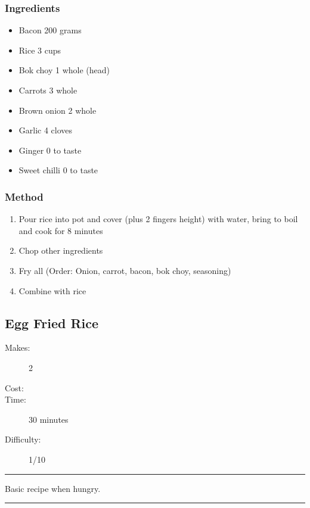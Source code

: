 \documentclass[]{article}
\begin{document}
\subsubsection*{\Large Ingredients}
\begin{multicols}{2}
\begin{itemize}
 \item Bacon \hfill 200 grams
 \item Rice \hfill 3 cups
 \item Bok choy \hfill 1 whole (head)
 \item Carrots \hfill 3 whole
 \item Brown onion \hfill 2 whole
 \item Garlic \hfill 4 cloves
 \item Ginger \hfill 0 to taste
 \item Sweet chilli \hfill 0 to taste
\end{itemize}
\end{multicols}
\subsubsection*{\Large Method}
\begin{enumerate}[font=\huge\color{accent}]
	\item Pour rice into pot and cover (plus 2 fingers height) with water, bring to boil and cook for 8 minutes
	\item Chop other ingredients
	\item Fry all (Order: Onion, carrot, bacon, bok choy, seasoning)
	\item Combine with rice
\end{enumerate}
\newpage
{}\label{rec:Egg Fried Rice}
\subsection*{\center\huge Egg Fried Rice}
\begin{description}
\item[Makes:] 2 
\item[Cost:] \textdollar
\item[Time:] 30 minutes
\item[Difficulty:] 1/10
\end{description}
\vspace{0.2cm}\hrule\vspace{0.5cm}
\begin{adjustwidth}{0.5 cm}{0.5 cm}

Basic recipe when hungry. \hfill{}\color{black}

\end{adjustwidth}
\vspace{0.5cm}\hrule
\end{document}
